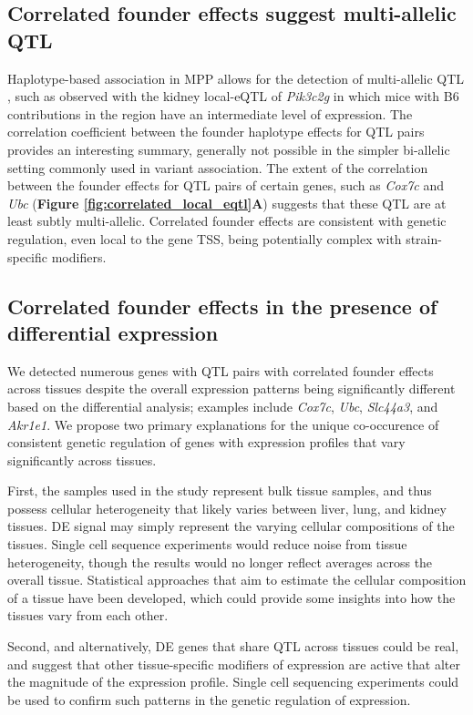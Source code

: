 \documentclass[9pt,twocolumn,twoside]{gsajnl}
\begin{document}
\subsection{Correlated founder effects suggest multi-allelic QTL}

Haplotype-based association in MPP allows for the detection of multi-allelic QTL \citep{Aylor2011}, such as observed with the kidney local-eQTL of \textit{Pik3c2g} in which mice with B6 contributions in the region have an intermediate level of expression. The correlation coefficient between the founder haplotype effects for QTL pairs provides an interesting summary, generally not possible in the simpler bi-allelic setting commonly used in variant association. The extent of the correlation between the founder effects for QTL pairs of certain genes, such as \textit{Cox7c} and \textit{Ubc} (\textbf{Figure \ref{fig:correlated_local_eqtl}A}) suggests that these QTL are at least subtly multi-allelic. Correlated founder effects are consistent with genetic regulation, even local to the gene TSS, being potentially complex with strain-specific modifiers.

\subsection{Correlated founder effects in the presence of differential expression}

We detected numerous genes with QTL pairs with correlated founder effects across tissues despite the overall expression patterns being significantly different based on the differential analysis; examples include \textit{Cox7c}, \textit{Ubc}, \textit{Slc44a3}, and \textit{Akr1e1}. We propose two primary explanations for the unique co-occurence of consistent genetic regulation of genes with expression profiles that vary significantly across tissues. 

First, the samples used in the study represent bulk tissue samples, and thus possess cellular heterogeneity that likely varies between liver, lung, and kidney tissues. DE signal may simply represent the varying cellular compositions of the tissues. Single cell sequence experiments would reduce noise from tissue heterogeneity, though the results would no longer reflect averages across the overall tissue. Statistical approaches that aim to estimate the cellular composition of a tissue \citep{Aran2017} have been developed, which could provide some insights into how the tissues vary from each other. 

Second, and alternatively, DE genes that share QTL across tissues could be real, and suggest that other tissue-specific modifiers of expression are active that alter the magnitude of the expression profile. Single cell sequencing experiments could be used to confirm such patterns in the genetic regulation of expression.
\end{document}
